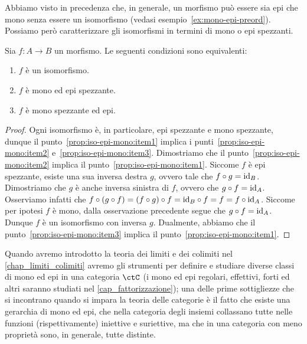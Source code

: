 Abbiamo visto in precedenza che, in generale, un morfismo pu\`o essere sia epi che mono senza essere un isomorfismo (vedasi esempio~\ref{ex:mono-epi-preord}).
Possiamo per\`o caratterizzare gli isomorfismi in termini di mono o epi spezzanti.

\begin{proposition}\label{prop:iso-epi-mono}
	Sia \(f \colon A \to B\) un morfismo. Le seguenti condizioni sono equivalenti:
	\begin{enumerate}
		\item\label{prop:iso-epi-mono:item1} \(f\) \`e un isomorfismo.
		\item\label{prop:iso-epi-mono:item2} \(f\) \`e mono ed epi spezzante.
		\item\label{prop:iso-epi-mono:item3} \(f\) \`e mono spezzante ed epi.
	\end{enumerate}
\end{proposition}
\begin{proof}
	Ogni isomorfismo \`e, in particolare, epi spezzante e mono spezzante, dunque il punto~\ref{prop:iso-epi-mono:item1} implica i punti~\ref{prop:iso-epi-mono:item2} e~\ref{prop:iso-epi-mono:item3}.
	Dimostriamo che il punto~\ref{prop:iso-epi-mono:item2} implica il punto~\ref{prop:iso-epi-mono:item1}.
	Siccome \(f\) \`e epi spezzante, esiste una sua inversa destra \(g\), ovvero tale che \(f \circ g = \mathrm{id}_{B}\).
	Dimostriamo che \(g\) \`e anche inversa sinistra di \(f\), ovvero che \(g \circ f = \mathrm{id}_{A}\).
	Osserviamo infatti che \(f \circ (g \circ f) = (f \circ g) \circ f = \mathrm{id}_{B} \circ f = f = f \circ \mathrm{id}_{A}\).
	Siccome per ipotesi \(f\) \`e mono, dalla osservazione precedente segue che \(g \circ f = \mathrm{id}_{A}\).
	Dunque \(f\) \`e un isomorfismo con inversa \(g\).
	Dualmente, abbiamo che il punto~\ref{prop:iso-epi-mono:item3} implica il punto~\ref{prop:iso-epi-mono:item1}.
\end{proof}
Quando avremo introdotto la teoria dei limiti e dei colimiti nel \autoref{chap_limiti_colimiti} avremo gli strumenti per definire e studiare diverse classi di mono ed epi in una categoria \(\ctC\) (i mono ed epi regolari, effettivi, forti ed altri saranno studiati nel \autoref{cap_fattorizzazione}); una delle prime sottigliezze che si incontrano quando si impara la teoria delle categorie è il fatto che esiste una gerarchia di mono ed epi, che nella categoria degli insiemi collassano tutte nelle funzioni (rispettivamente) iniettive e suriettive, ma che in una categoria con meno proprietà sono, in generale, tutte distinte.

